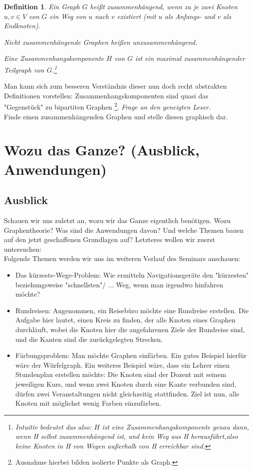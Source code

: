 \documentclass{article}
\newtheorem{definition}{Definition}
\begin{document}
\begin{definition}
	Ein Graph $G$ heißt \emph{zusammenhängend}, wenn zu je zwei Knoten $u, v \in V$ von $G$ ein \emph{Weg} von $u$ nach $v$ existiert (mit $u$ als Anfangs- und $v$ als Endknoten).
	\par\bigskip
	Nicht zusammenhängende Graphen heißen \emph{unzusammenhängend}.
	\par\bigskip
	Eine \emph{Zusammenhangskomponente} $H$ von $G$ ist ein \emph{maximal zusammenhängender Teilgraph} von $G$.\footnote[2]{Intuitiv bedeutet das also: $H$ ist eine Zusammenhangskomponente genau dann, wenn H selbst zusammenhängend ist, und \emph{kein Weg aus H herausführt},also keine Knoten in H von Wegen außerhalb von H erreichbar sind.}
\end{definition}
Man kann sich zum besseren Verständnis dieser nun doch recht abstrakten Definitionen vorstellen: Zusammenhangskomponenten sind quasi das "Gegenstück" zu bipartiten Graphen \footnote[3]{Ausnahme hierbei bilden isolierte Punkte als Graph.}.
\bigskip
\emph{Frage an den geneigten Leser.}\\
Finde einen zusammenhängenden Graphen und stelle diesen graphisch dar.\\

\newpage
\section[Wozu das Ganze?]{Wozu das Ganze? (Ausblick, Anwendungen)}
\subsection{Ausblick}
Schauen wir uns zuletzt an, wozu wir das Ganze eigentlich benötigen. Wozu Graphentheorie? Was sind die Anwendungen davon? Und welche Themen bauen auf den jetzt geschaffenen Grundlagen auf? Letzteres wollen wir zuerst untersuchen:\\
Folgende Themen werden wir uns im weiteren Verlauf des Seminars anschauen:\\
\begin{itemize}
	\item{Das kürzeste-Wege-Problem: Wie ermitteln Navigationsgeräte den "kürzesten" beziehungsweise "schnellsten"/ $\ldots$ Weg, wenn man irgendwo hinfahren möchte?}
	\item{Rundreisen: Angenommen, ein Reisebüro möchte eine Rundreise erstellen. Die Aufgabe hier lautet, einen Kreis zu finden, der alle Knoten eines Graphen durchläuft, wobei die Knoten hier die angefahrenen Ziele der Rundreise sind, und die Kanten sind die zurückgelegten Strecken.}
	\item{Färbungsproblem: Man möchte Graphen einfärben. Ein gutes Beispiel hierfür wäre der Würfelgraph. Ein weiteres Beispiel wäre, dass ein Lehrer einen Stundenplan erstellen möchte: Die Knoten sind der Dozent mit seinem jeweiligen Kurs, und wenn zwei Knoten durch eine Kante verbunden sind, dürfen zwei Veranstaltungen nicht gleichzeitig stattfinden. Ziel ist nun, alle Knoten mit möglichst wenig Farben einzufärben.}
\end{itemize}
\end{document}
